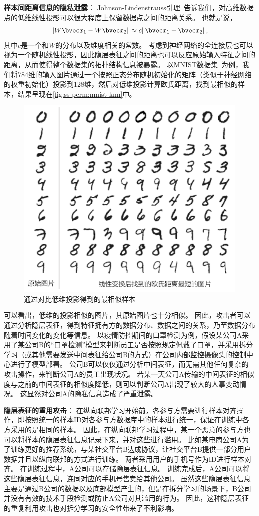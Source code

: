 \textbf{样本间距离信息的隐私泄露}：
%
Johnson-Lindenstrauss引理~\cite{matouvsek_2008_jl_lemma}告诉我们，对高维数据点的低维线性投影可以很大程度上保留数据点之间的距离关系。
%
也就是说，
\begin{equation}
    \Vert W \bvec x_1 - W \bvec x_2 \Vert \approx c\Vert \bvec x_1 - \bvec x_2 \Vert,    
\end{equation}
其中$c$是一个和$W$的分布以及维度相关的常数。
%
考虑到神经网络的全连接层也可以视为一个随机线性投影，因此隐层表征之间的距离也可以反应原始输入特征之间的距离，从而使得整个数据集的拓扑结构信息被暴露。
%
以MNIST数据集~\cite{mnist}为例，我们将784维的输入图片通过一个按照正态分布随机初始化的矩阵（类似于神经网络的权重初始化）投影到128维，然后对低维投影计算欧氏距离，找到最相似的样本，结果呈现在\autoref{fig:ss-perm:mnist-knn}中。
%
%
\begin{figure}[h!]
    \centering
    \includegraphics[width=0.66\linewidth]{Z_Resources/ss-perm_mnist-knn}
    \caption{通过对比低维投影得到的最相似样本}
    \label{fig:ss-perm:mnist-knn}
\end{figure}
%
可以看出，低维的投影相似的图片，其原始图片也十分相似。
%
因此，攻击者可以通过分析隐层表征，得到特征拥有方的数据分布、数据之间的关系，乃至数据分布随着时间变化的变化等信息。
%
以疫情防控期间的口罩检测为例，假设某公司A采用了某公司B的“口罩检测”模型来判断员工是否按照规定佩戴了口罩，并采用拆分学习（或其他需要发送中间表征给公司B的方式）在公司内部监控摄像头的控制中心进行了模型部署。
%
公司B可以仅仅通过分析中间表征，而无需其他任何复杂的攻击操作，来判断公司A的员工出现状况。
若某一天公司A传输的中间表征的相似度与之前的中间表征的相似度降低，则可以判断公司A出现了较大的人事变动情况。
%
这显然对公司A的隐私信息造成了严重泄露。


\textbf{隐层表征的重用攻击}：
在纵向联邦学习开始前，各参与方需要进行样本对齐操作，即按照统一的样本ID对各参与方数据库中的样本进行统一，保证在训练中各方采用的是相同的样本。
%
因此，在纵向联邦学习过程中，某一个恶意的参与方也可以将样本的隐层表征信息记录下来，并对这些进行滥用。
%
比如某电商公司A为了训练更好的推荐系统，与某社交平台B达成协议，让社交平台B提供一部分用户数据并且以纵向联邦的方式进行训练。
两者采用用户的手机号作为ID进行样本对齐。
%
在训练过程中，A公司可以存储隐层表征信息。
%
训练完成后，A公司可以将这些隐层表征信息，连同对应的手机号售卖给其他公司。
%
虽然这些隐层表征信息主要是通过B公司的数据以及底部模型产生的，但是在拆分学习的场景下，B公司并没有有效的技术手段检测或防止A公司对其滥用的行为。
%
因此，这种隐层表征的重复利用攻击也对拆分学习的安全性带来了不利影响。

